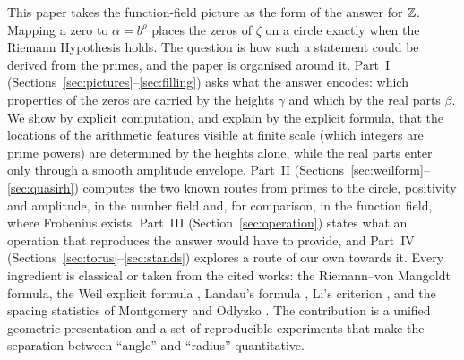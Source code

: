 \documentclass[11pt,a4paper]{article}
\theoremstyle{definition}\newtheorem{definition}[proposition]{Definition}
\theoremstyle{remark}\newtheorem{remark}[proposition]{Remark}
\begin{document}
This paper takes the function-field picture as the form of the answer for $\mathbb Z$. Mapping a zero to $\alpha=b^\rho$ places the zeros of $\zeta$ on a circle exactly when the Riemann Hypothesis holds. The question is how such a statement could be derived from the primes, and the paper is organised around it. Part~I (Sections~\ref{sec:pictures}--\ref{sec:filling}) asks what the answer encodes: which properties of the zeros are carried by the heights $\gamma$ and which by the real parts $\beta$. We show by explicit computation, and explain by the explicit formula, that the locations of the arithmetic features visible at finite scale (which integers are prime powers) are determined by the heights alone, while the real parts enter only through a smooth amplitude envelope. Part~II (Sections~\ref{sec:weilform}--\ref{sec:quasirh}) computes the two known routes from primes to the circle, positivity and amplitude, in the number field and, for comparison, in the function field, where Frobenius exists. Part~III (Section~\ref{sec:operation}) states what an operation that reproduces the answer would have to provide, and Part~IV (Sections~\ref{sec:torus}--\ref{sec:stands}) explores a route of our own towards it. Every ingredient is classical or taken from the cited works: the Riemann--von Mangoldt formula, the Weil explicit formula \cite{Weil1952}, Landau's formula \cite{Landau1912}, Li's criterion \cite{Li1997}, and the spacing statistics of Montgomery and Odlyzko \cite{Montgomery1973,Odlyzko1987}. The contribution is a unified geometric presentation and a set of reproducible experiments that make the separation between ``angle'' and ``radius'' quantitative.
\end{document}
